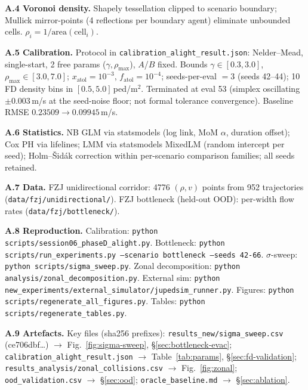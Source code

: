 \documentclass[a4paper,twoside]{article}
\begin{document}
\textbf{A.4 Voronoi density.} Shapely tessellation clipped to scenario boundary; Mullick mirror-points (4 reflections per boundary agent) eliminate unbounded cells. $\rho_i=1/\text{area}(\text{cell}_i)$.

\textbf{A.5 Calibration.} Protocol in \texttt{calibration\_alight\_result.json}: Nelder--Mead, single-start, 2 free params ($\gamma,\rho_{\max}$), $A$/$B$ fixed. Bounds $\gamma\in[0.3,3.0]$, $\rho_{\max}\in[3.0,7.0]$; $x_{\text{atol}}{=}10^{-3}$, $f_{\text{atol}}{=}10^{-4}$; seeds-per-eval $=3$ (seeds 42--44); 10 FD density bins in $[0.5,5.0]$\,ped/m$^2$. Terminated at eval 53 (simplex oscillating $\pm 0.003$\,m/s at the seed-noise floor; not formal tolerance convergence). Baseline RMSE $0.23509\to 0.09945$\,m/s.

\textbf{A.6 Statistics.} NB GLM via statsmodels (log link, MoM $\alpha$, duration offset); Cox PH via lifelines; LMM via statsmodels MixedLM (random intercept per seed); Holm--\v{S}id\'ak correction within per-scenario comparison families; all seeds retained.

\textbf{A.7 Data.} FZJ unidirectional corridor: 4776 $(\rho,v)$ points from 952 trajectories (\texttt{data/fzj/unidirectional/}). FZJ bottleneck (held-out OOD): per-width flow rates (\texttt{data/fzj/bottleneck/}).

\textbf{A.8 Reproduction.} Calibration: \texttt{python scripts/session06\_phaseD\_alight.py}. Bottleneck: \texttt{python scripts/run\_experiments.py --scenario bottleneck --seeds 42-66}. $\sigma$-sweep: \texttt{python scripts/sigma\_sweep.py}. Zonal decomposition: \texttt{python analysis/zonal\_decomposition.py}. External sim: \texttt{python new\_experiments/external\_simulator/jupedsim\_runner.py}. Figures: \texttt{python scripts/regenerate\_all\_figures.py}. Tables: \texttt{python scripts/regenerate\_tables.py}.

\textbf{A.9 Artefacts.} Key files (sha256 prefixes): \texttt{results\_new/sigma\_sweep.csv} (ce706dbf\ldots) $\to$ Fig.~\ref{fig:sigma-sweep}, \S\ref{sec:bottleneck-evac}; \texttt{calibration\_alight\_result.json} $\to$ Table~\ref{tab:params}, \S\ref{sec:fd-validation}; \texttt{results\_analysis/zonal\_collisions.csv} $\to$ Fig.~\ref{fig:zonal}; \texttt{ood\_validation.csv} $\to$ \S\ref{sec:ood}; \texttt{oracle\_baseline.md} $\to$ \S\ref{sec:ablation}.

\normalsize
\end{document}
